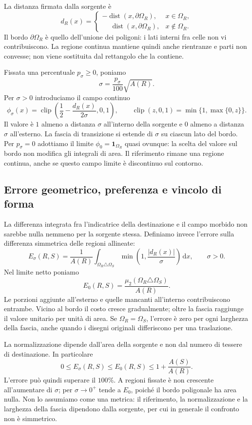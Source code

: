 \documentclass[11pt,a4paper]{article}
\begin{document}
La distanza firmata dalla sorgente è
\[
d_R(x)=
\begin{cases}
-\operatorname{dist}(x,\partial\Omega_R),&x\in\Omega_R,\\
\phantom{-}\operatorname{dist}(x,\partial\Omega_R),&x\notin\Omega_R.
\end{cases}
\]
Il bordo $\partial\Omega_R$ è quello dell'unione dei poligoni: i lati interni fra celle non vi contribuiscono. La regione continua mantiene quindi anche rientranze e parti non convesse; non viene sostituita dal rettangolo che la contiene.

Fissata una percentuale $p_\sigma\geq0$, poniamo
\[
\boxed{\sigma=\frac{p_\sigma}{100}\sqrt{A(R)}.}
\]
Per $\sigma>0$ introduciamo il campo continuo
\[
\boxed{\phi_\sigma(x)=
\operatorname{clip}\!\left(\frac12-\frac{d_R(x)}{2\sigma},0,1\right),}
\qquad
\operatorname{clip}(z,0,1)=\min\{1,\max\{0,z\}\}.
\]
Il valore è $1$ almeno a distanza $\sigma$ all'interno della sorgente e $0$ almeno a distanza $\sigma$ all'esterno. La fascia di transizione si estende di $\sigma$ su ciascun lato del bordo. Per $p_\sigma=0$ adottiamo il limite $\phi_0=\mathbf1_{\Omega_R}$ quasi ovunque: la scelta del valore sul bordo non modifica gli integrali di area. Il riferimento rimane una regione continua, anche se questo campo limite è discontinuo sul contorno.

\subsection{Errore geometrico, preferenza e vincolo di forma}
\label{sec:errore-forma}

La differenza integrata fra l'indicatrice della destinazione e il campo morbido non sarebbe nulla nemmeno per la sorgente stessa. Definiamo invece l'errore sulla differenza simmetrica delle regioni allineate:
\[
\boxed{
E_\sigma(R,S)=\frac{1}{A(R)}
\int_{\Omega_R\triangle\Omega_S}
\min\!\left(1,\frac{|d_R(x)|}{\sigma}\right)\,\mathrm dx,
\qquad \sigma>0.}
\]
Nel limite netto poniamo
\[
\boxed{E_0(R,S)=
\frac{\mu_2(\Omega_R\triangle\Omega_S)}{A(R)}.}
\]
Le porzioni aggiunte all'esterno e quelle mancanti all'interno contribuiscono entrambe. Vicino al bordo il costo cresce gradualmente; oltre la fascia raggiunge il valore unitario per unità di area. Se $\Omega_R=\Omega_S$, l'errore è zero per ogni larghezza della fascia, anche quando i disegni originali differiscono per una traslazione.

La normalizzazione dipende dall'area della sorgente e non dal numero di tessere di destinazione. In particolare
\[
0\leq E_\sigma(R,S)\leq E_0(R,S)
\leq 1+\frac{A(S)}{A(R)}.
\]
L'errore può quindi superare il $100\%$. A regioni fissate è non crescente all'aumentare di $\sigma$; per $\sigma\to0^+$ tende a $E_0$, poiché il bordo poligonale ha area nulla. Non lo assumiamo come una metrica: il riferimento, la normalizzazione e la larghezza della fascia dipendono dalla sorgente, per cui in generale il confronto non è simmetrico.
\end{document}
